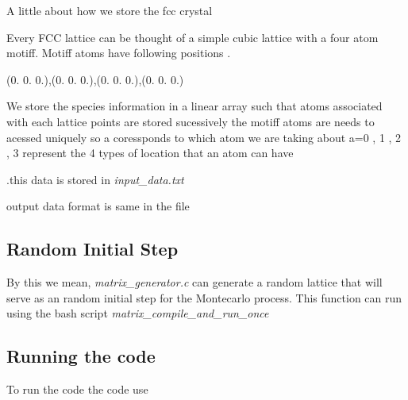 A little about how we store the fcc crystal

Every F\+CC lattice can be thought of a simple cubic lattice with a four atom motiff. Motiff atoms have following positions .

(0. 0. 0.),(0. 0. 0.),(0. 0. 0.),(0. 0. 0.)

We store the species information in a linear array such that atoms associated with each lattice points are stored sucessively the motiff atoms are needs to acessed uniquely so a coressponds to which atom we are taking about a=0 , 1 , 2 , 3 represent the 4 types of location that an atom can have

.this data is stored in {\itshape input\+\_\+data.\+txt}

output data format is same in the file

\subsection*{Random Initial Step}

By this we mean, {\itshape matrix\+\_\+generator.\+c} can generate a random lattice that will serve as an random initial step for the Montecarlo process. This function can run using the bash script {\itshape matrix\+\_\+compile\+\_\+and\+\_\+run\+\_\+once}

\subsection*{Running the code}

To run the code the code use 
 